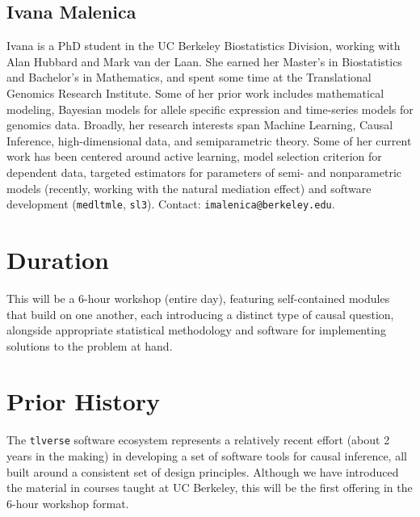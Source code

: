 \documentclass[a4paper,11pt]{texMemo}
\begin{document}
\subsection{Ivana Malenica}

Ivana is a PhD student in the UC Berkeley Biostatistics Division, working
with Alan Hubbard and Mark van der Laan. She earned her Master's in
Biostatistics and Bachelor's in Mathematics, and spent some time at the
Translational Genomics Research Institute. Some of her prior work includes
mathematical modeling, Bayesian models for allele specific expression and
time-series models for genomics data. Broadly, her research interests span
Machine Learning, Causal Inference, high-dimensional data, and semiparametric
theory. Some of her current work has been centered around active learning, model
selection criterion for dependent data, targeted estimators for parameters of
semi- and nonparametric models (recently, working with the natural mediation
effect) and software development (\texttt{medltmle}, \texttt{sl3}). Contact:
\texttt{imalenica@berkeley.edu}.

\section{Duration}

This will be a 6-hour workshop (entire day), featuring self-contained modules
that build on one another, each introducing a distinct type of causal question,
alongside appropriate statistical methodology and software for implementing
solutions to the problem at hand.

\section{Prior History}

The \texttt{tlverse} software ecosystem represents a relatively recent effort
(about 2 years in the making) in developing a set of software tools for causal
inference, all built around a consistent set of design principles. Although we
have introduced the material in courses taught at UC Berkeley, this will be the
first offering in the 6-hour workshop format.
\end{document}
